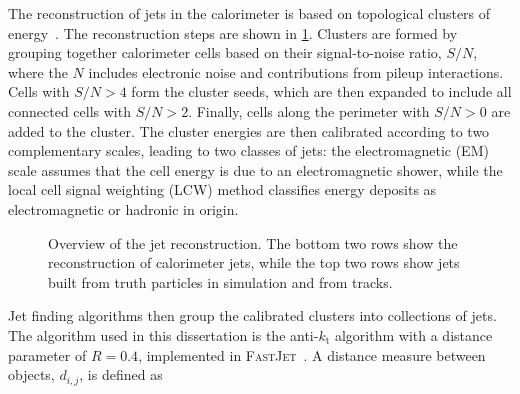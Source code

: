 The reconstruction of jets in the calorimeter is based on topological clusters of energy~\cite{TheATLASCollaboration:2011ks,TheATLASCollaboration:2015ds}. The reconstruction steps are shown in \ref{fig:reco-jet-reconstruction-flowchart}. Clusters are formed by grouping together calorimeter cells based on their signal-to-noise ratio, $S/N$, where the $N$ includes electronic noise and contributions from pileup interactions. Cells with $S/N>4$ form the cluster seeds, which are then expanded to include all connected cells with $S/N>2$. Finally, cells along the perimeter with $S/N>0$ are added to the cluster. The cluster energies are then calibrated according to two complementary scales, leading to two classes of jets: the electromagnetic (EM) scale assumes that the cell energy is due to an electromagnetic shower, while the local cell signal weighting (LCW) method classifies energy deposits as electromagnetic or hadronic in origin. 

\begin{figure}[htbp]
	\centering
	\caption{Overview of the jet reconstruction. The bottom two rows show the reconstruction of calorimeter jets, while the top two rows show jets built from truth particles in simulation and from tracks.}
	\label{fig:reco-jet-reconstruction-flowchart}
\end{figure}


Jet finding algorithms then group the calibrated clusters into collections of jets. The algorithm used in this dissertation is the anti-$k_{\mathrm{t}}$ algorithm with a distance parameter of $R=0.4$, implemented in \textsc{FastJet}~\cite{Cacciari:2008gp,Cacciari:2011ma}. A distance measure between objects, $d_{i,j}$, is defined as


